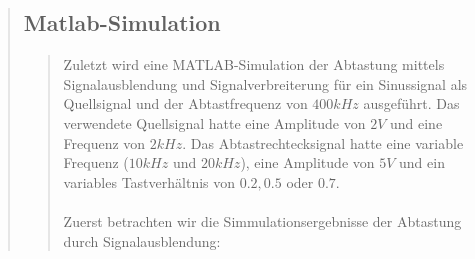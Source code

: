 \begin{quote}
\begin{quote}
        
               
    \end{quote}  %
    
    \subsection{Matlab-Simulation}
    \begin{quote}
    
        Zuletzt wird eine MATLAB-Simulation der Abtastung mittels Signalausblendung
        und Signalverbreiterung für ein Sinussignal als Quellsignal und der
        Abtastfrequenz von $400 kHz$ ausgeführt. Das verwendete Quellsignal
        hatte eine Amplitude von $2V$ und eine Frequenz von $2 kHz$. Das
        Abtastrechtecksignal hatte eine variable Frequenz ($10 kHz$ und $20 kHz$),
        eine Amplitude von $5V$ und ein
        variables Tastverhältnis von $0.2, 0.5$ oder $0.7$.\\
        
         \\
        
        Zuerst betrachten wir die Simmulationsergebnisse der Abtastung durch
        Signalausblendung:
        

\end{quote}
\end{quote}
